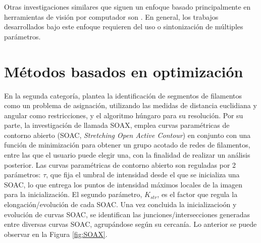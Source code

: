 Otras investigaciones similares que siguen un enfoque basado principalmente en herramientas de visi\'on por computador son \cite{doi:10.1021/ma502264c}\cite{lichtenstein2003quantitative}\cite{asgharzadeh2018computational}. En general, los trabajos desarrollados bajo este enfoque requieren del uso o sintonizaci\'on de m\'ultiples par\'ametros.




\section{M\'etodos basados en optimizaci\'on}
\label{sec:OptiMethods}
En la segunda categor\'ia, \cite{cerda2014geometrical} plantea la identificaci\'on de segmentos de filamentos como un problema de asignaci\'on, utilizando las medidas de distancia euclidiana y angular como restricciones, y el algoritmo h\'ungaro para su resoluci\'on.
Por su parte, la investigaci\'on de \cite{xu2015soax} llamada SOAX, emplea curvas param\'etricas de contorno abierto (SOAC, {\it Stretching Open Active Contour}) en conjunto con una funci\'on de minimizaci\'on para obtener un grupo acotado de redes de filamentos, entre las que el usuario puede elegir una, con la finalidad de realizar un an\'alisis posterior. Las curvas param\'etricas de contorno abierto son reguladas por 2 par\'ametros: $\tau$, que fija el umbral de intensidad desde el que se inicializa una SOAC, lo que entrega los puntos de intensidad m\'aximos locales de la imagen para la inicializaci\'on. El segundo par\'ametro, $K_{str}$, es el factor que regula la elongaci\'on/evoluci\'on de cada SOAC. Una vez concluida la inicializacio\'on y evoluci\'on de curvas SOAC, se identifican las junciones/intersecciones generadas entre diversas curvas SOAC, agrup\'andose seg\'un su cercan\'ia. Lo anterior se puede observar en la Figura \ref{fig:SOAX}.

